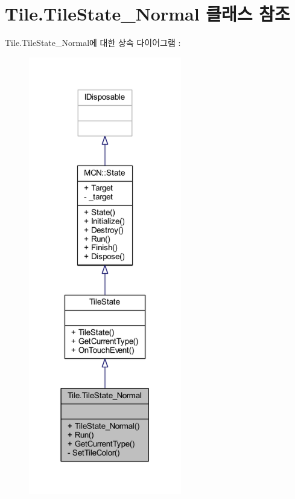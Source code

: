 \hypertarget{class_tile_1_1_tile_state___normal}{}\section{Tile.\+Tile\+State\+\_\+\+Normal 클래스 참조}
\label{class_tile_1_1_tile_state___normal}


Tile.\+Tile\+State\+\_\+\+Normal에 대한 상속 다이어그램 \+: \nopagebreak
\begin{figure}[H]
\begin{center}
\leavevmode
\includegraphics[width=189pt]{class_tile_1_1_tile_state___normal__inherit__graph}
\end{center}
\end{figure}


